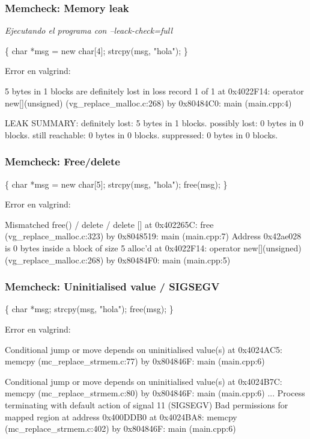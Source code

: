 \documentclass{beamer}
\begin{document}
\begin{frame}[fragile, shrink=25]
\frametitle{Memcheck: Memory leak}
\textit{ Ejecutando el programa con --leack-check=full }
\begin{semiverbatim}
\{
  char *msg = new char[4];
  strcpy(msg, "hola");
\}
\end{semiverbatim}

Error en valgrind:
\begin{semiverbatim}
\alert{5 bytes in 1 blocks are definitely lost} in loss record 1 of 1
   at 0x4022F14: operator new[](unsigned) (vg_replace_malloc.c:268)
   by 0x80484C0: \alert{main (main.cpp:4)}

LEAK SUMMARY:
   \alert{ definitely lost: 5 bytes in 1 blocks. }
     possibly lost: 0 bytes in 0 blocks.
   still reachable: 0 bytes in 0 blocks.
        suppressed: 0 bytes in 0 blocks.
\end{semiverbatim}
\end{frame}

\begin{frame}[fragile, shrink=25]
\frametitle{Memcheck: Free/delete}
\begin{semiverbatim}
\{
  char *msg = new char[5];
  strcpy(msg, "hola");
  free(msg);
\}
\end{semiverbatim}

Error en valgrind:
\begin{semiverbatim}
\alert{Mismatched free() / delete / delete} []
   at 0x402265C: free (vg_replace_malloc.c:323)
   by 0x8048519: \alert{main (main.cpp:7)}
 Address 0x42ae028 is 0 bytes inside a block of size 5 alloc'd
   at 0x4022F14: operator new[](unsigned) (vg_replace_malloc.c:268)
   by 0x80484F0: main (main.cpp:5)
\end{semiverbatim}
\end{frame}

\begin{frame}[fragile, shrink=25]
\frametitle{Memcheck: Uninitialised value / SIGSEGV}
\begin{semiverbatim}
\{
  char *msg;
  strcpy(msg, "hola");
  free(msg);
\}
\end{semiverbatim}

Error en valgrind:
\begin{semiverbatim}
\alert{ Conditional jump or move depends on uninitialised value(s) }
   at 0x4024AC5: memcpy (mc_replace_strmem.c:77)
   by 0x804846F: main \alert{ (main.cpp:6) }

\alert{ Conditional jump or move depends on uninitialised value(s) }
   at 0x4024B7C: memcpy (mc_replace_strmem.c:80)
   by 0x804846F: main \alert{ (main.cpp:6) }
...
\alert{ Process terminating with default action of signal 11 (SIGSEGV) }
 Bad permissions for mapped region at address 0x400DDB0
   at 0x4024BA8: memcpy (mc_replace_strmem.c:402)
   by 0x804846F: \alert{ main (main.cpp:6) }
\end{semiverbatim}
\end{frame}
\end{document}
